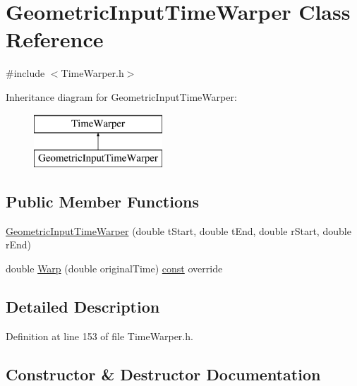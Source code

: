 \hypertarget{class_geometric_input_time_warper}{}\section{Geometric\+Input\+Time\+Warper Class Reference}
\label{class_geometric_input_time_warper}


{\ttfamily \#include $<$Time\+Warper.\+h$>$}

Inheritance diagram for Geometric\+Input\+Time\+Warper\+:\begin{figure}[H]
\begin{center}
\leavevmode
\includegraphics[height=2.000000cm]{class_geometric_input_time_warper}
\end{center}
\end{figure}
\subsection*{Public Member Functions}
\begin{DoxyCompactItemize}
\item 
\hyperlink{class_geometric_input_time_warper_a71f48f49996614fbfe03371ed37e14d7}{Geometric\+Input\+Time\+Warper} (double t\+Start, double t\+End, double r\+Start, double r\+End)
\item 
double \hyperlink{class_geometric_input_time_warper_aa0a5547421befe96fd42b2b76aa4a55a}{Warp} (double original\+Time) \hyperlink{getopt1_8c_a2c212835823e3c54a8ab6d95c652660e}{const}  override
\end{DoxyCompactItemize}


\subsection{Detailed Description}


Definition at line 153 of file Time\+Warper.\+h.



\subsection{Constructor \& Destructor Documentation}
